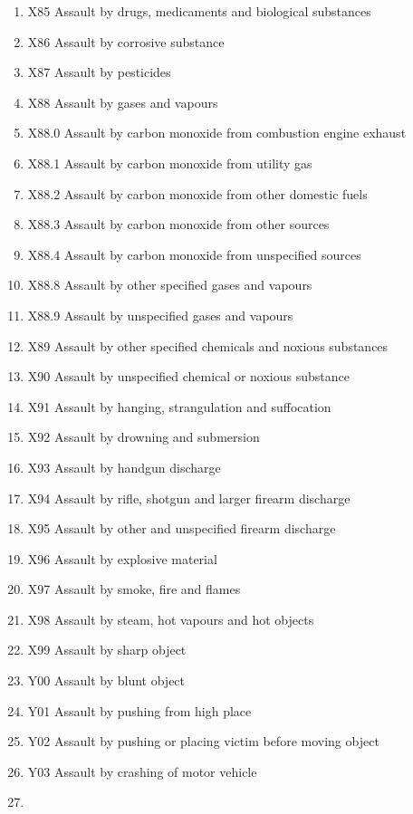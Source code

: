 \documentclass[
]{scrartcl}
\begin{document}
\begin{itemize}
\begin{enumerate}
  \item
    X85 Assault by drugs, medicaments and biological substances
  \item
    X86 Assault by corrosive substance
  \item
    X87 Assault by pesticides
  \item
    X88 Assault by gases and vapours
  \item
    X88.0 Assault by carbon monoxide from combustion engine exhaust
  \item
    X88.1 Assault by carbon monoxide from utility gas
  \item
    X88.2 Assault by carbon monoxide from other domestic fuels
  \item
    X88.3 Assault by carbon monoxide from other sources
  \item
    X88.4 Assault by carbon monoxide from unspecified sources
  \item
    X88.8 Assault by other specified gases and vapours
  \item
    X88.9 Assault by unspecified gases and vapours
  \item
    X89 Assault by other specified chemicals and noxious substances
  \item
    X90 Assault by unspecified chemical or noxious substance
  \item
    X91 Assault by hanging, strangulation and suffocation
  \item
    X92 Assault by drowning and submersion
  \item
    X93 Assault by handgun discharge
  \item
    X94 Assault by rifle, shotgun and larger firearm discharge
  \item
    X95 Assault by other and unspecified firearm discharge
  \item
    X96 Assault by explosive material
  \item
    X97 Assault by smoke, fire and flames
  \item
    X98 Assault by steam, hot vapours and hot objects
  \item
    X99 Assault by sharp object
  \item
    Y00 Assault by blunt object
  \item
    Y01 Assault by pushing from high place
  \item
    Y02 Assault by pushing or placing victim before moving object
  \item
    Y03 Assault by crashing of motor vehicle
  \item

\end{enumerate}
\end{itemize}
\end{document}
